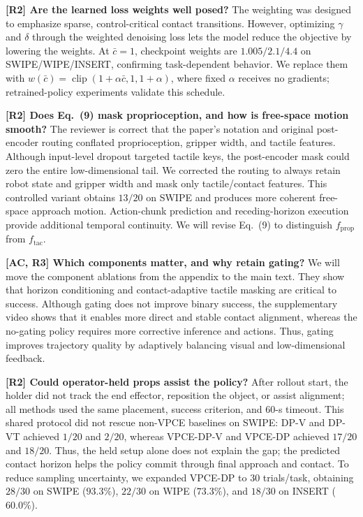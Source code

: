 \documentclass[conference]{IEEEtran}
\newcommand{\newparagraph}[1]{{\bf #1}}
\begin{document}
\newparagraph{[R2] Are the learned loss weights well posed?}
The weighting was designed to emphasize sparse, control-critical contact
transitions. However, optimizing $\gamma$ and $\delta$ through the weighted
denoising loss lets the model reduce the objective by lowering the weights.
At $\bar c{=}1$, checkpoint weights are $1.005/2.1/4.4$ on
SWIPE/WIPE/INSERT, confirming task-dependent behavior. We replace them with
$w(\bar c)=\operatorname{clip}(1+\alpha\bar c,1,1+\alpha)$, where fixed
$\alpha$ receives no gradients; retrained-policy experiments validate this
schedule.

\newparagraph{[R2] Does Eq.~(9) mask proprioception, and how is free-space
motion smooth?}
The reviewer is correct that the paper's notation and original post-encoder
routing conflated proprioception, gripper width, and tactile features. Although
input-level dropout targeted tactile keys, the post-encoder mask could zero the
entire low-dimensional tail. We corrected the routing to always retain robot
state and gripper width and mask only tactile/contact features. This controlled
variant obtains $13/20$ on SWIPE and produces more coherent free-space approach
motion. Action-chunk prediction and receding-horizon execution provide additional
temporal continuity. We will revise Eq.~(9) to distinguish
$f_{\mathrm{prop}}$ from $f_{\mathrm{tac}}$.

\newparagraph{[AC, R3] Which components matter, and why retain gating?}
  We will move the component ablations from the appendix to the main text. They
  show that horizon conditioning and contact-adaptive tactile masking are critical
  to success. Although gating does not improve binary success, the supplementary
  video shows that it enables more direct and stable contact alignment, whereas
  the no-gating policy requires more corrective inference and actions. Thus,
  gating improves trajectory quality by adaptively balancing visual and
  low-dimensional feedback.

\newparagraph{[R2] Could operator-held props assist the policy?}
After rollout start, the holder did not track the end effector, reposition
  the object, or assist alignment; all methods used the same placement,
  success criterion, and 60-s timeout. This shared protocol did not rescue
  non-VPCE baselines on SWIPE: DP-V and DP-VT achieved $1/20$ and $2/20$,
  whereas VPCE-DP-V and VPCE-DP achieved $17/20$ and $18/20$. Thus, the held
  setup alone does not explain the gap; the predicted contact horizon helps
  the
  policy commit through final approach and contact. To reduce sampling
  uncertainty, we expanded VPCE-DP to $30$ trials/task, obtaining $28/30$ on
  SWIPE ($93.3\%$), $22/30$ on WIPE ($73.3\%$), and $18/30$ on INSERT
  ($60.0\%$).
\end{document}
